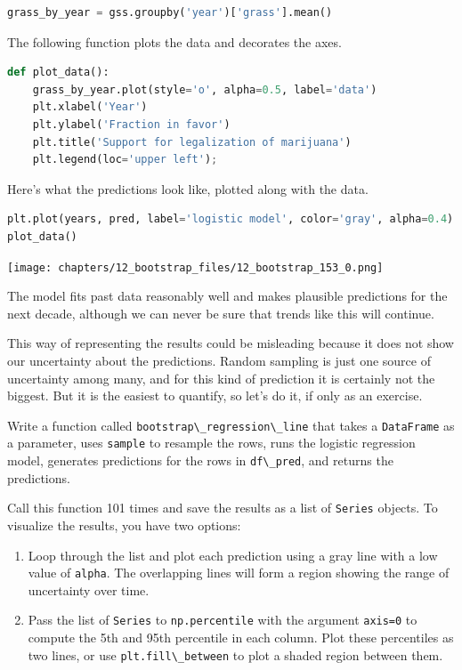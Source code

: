 \begin{lstlisting}[language=Python,style=source]
grass_by_year = gss.groupby('year')['grass'].mean()
\end{lstlisting}

The following function plots the data and decorates the axes.

\begin{lstlisting}[language=Python,style=source]
def plot_data():
    grass_by_year.plot(style='o', alpha=0.5, label='data')
    plt.xlabel('Year')
    plt.ylabel('Fraction in favor')
    plt.title('Support for legalization of marijuana')
    plt.legend(loc='upper left');
\end{lstlisting}

Here's what the predictions look like, plotted along with the data.

\begin{lstlisting}[language=Python,style=source]
plt.plot(years, pred, label='logistic model', color='gray', alpha=0.4)
plot_data()
\end{lstlisting}

\begin{center}
\texttt{[image: chapters/12\_bootstrap\_files/12\_bootstrap\_153\_0.png]}
\end{center}

The model fits past data reasonably well and makes plausible predictions
for the next decade, although we can never be sure that trends like this
will continue.

This way of representing the results could be misleading because it does
not show our uncertainty about the predictions. Random sampling is just
one source of uncertainty among many, and for this kind of prediction it
is certainly not the biggest. But it is the easiest to quantify, so
let's do it, if only as an exercise.

Write a function called
\passthrough{\lstinline!bootstrap\_regression\_line!} that takes a
\passthrough{\lstinline!DataFrame!} as a parameter, uses
\passthrough{\lstinline!sample!} to resample the rows, runs the logistic
regression model, generates predictions for the rows in
\passthrough{\lstinline!df\_pred!}, and returns the predictions.

Call this function 101 times and save the results as a list of
\passthrough{\lstinline!Series!} objects. To visualize the results, you
have two options:

\begin{enumerate}
\def\labelenumi{\arabic{enumi}.}
\item
  Loop through the list and plot each prediction using a gray line with
  a low value of \passthrough{\lstinline!alpha!}. The overlapping lines
  will form a region showing the range of uncertainty over time.
\item
  Pass the list of \passthrough{\lstinline!Series!} to
  \passthrough{\lstinline!np.percentile!} with the argument
  \passthrough{\lstinline!axis=0!} to compute the 5th and 95th
  percentile in each column. Plot these percentiles as two lines, or use
  \passthrough{\lstinline!plt.fill\_between!} to plot a shaded region
  between them.
\end{enumerate}

